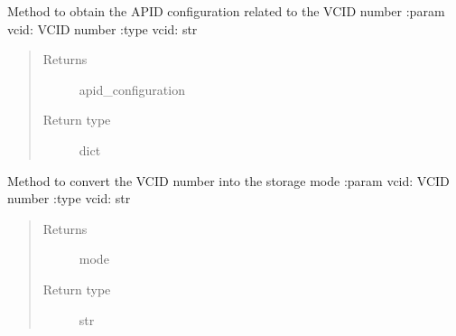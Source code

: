 
\begin{fulllineitems}
\label{\detokenize{s2boa.ingestions:s2boa.ingestions.functions.get_vcid_apid_configuration}}
\sphinxAtStartPar
Method to obtain the APID configuration related to the VCID number
:param vcid: VCID number
:type vcid: str
\begin{quote}\begin{description}
\item[{Returns}] \leavevmode
\sphinxAtStartPar
apid\_configuration

\item[{Return type}] \leavevmode
\sphinxAtStartPar
dict

\end{description}\end{quote}

\end{fulllineitems}


\begin{fulllineitems}
\label{\detokenize{s2boa.ingestions:s2boa.ingestions.functions.get_vcid_mode}}
\sphinxAtStartPar
Method to convert the VCID number into the storage mode
:param vcid: VCID number
:type vcid: str
\begin{quote}\begin{description}
\item[{Returns}] \leavevmode
\sphinxAtStartPar
mode

\item[{Return type}] \leavevmode
\sphinxAtStartPar
str

\end{description}\end{quote}

\end{fulllineitems}


